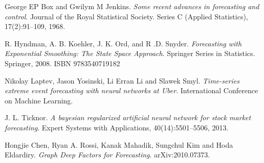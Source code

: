 \documentclass[en]{pracamgr}
\begin{document}
\begin{thebibliography}{99}
 George EP Box and Gwilym M Jenkins. \textit{Some recent advances in forecasting and control}. Journal of the
Royal Statistical Society. Series C (Applied Statistics), 17(2):91–109, 1968.

 R. Hyndman, A. B. Koehler, J. K. Ord, and R .D. Snyder. \textit{Forecasting with Exponential Smoothing: The State Space Approach}. Springer Series in Statistics. Springer, 2008. ISBN
9783540719182

 Nikolay Laptev, Jason Yosinski, Li Erran Li and Slawek Smyl. \textit{Time-series extreme event forecasting with neural networks at Uber}. International Conference on Machine Learning.

 J. L. Ticknor. \textit{A bayesian regularized artificial neural network for stock market forecasting}. Expert Systems with Applications, 40(14):5501–5506, 2013.

 Hongjie Chen, Ryan A. Rossi, Kanak Mahadik, Sungchul Kim and Hoda Eldardiry. \textit{Graph Deep Factors for Forecasting}. arXiv:2010.07373.

%
%
%
%
%
%
%
%
%
%

\end{thebibliography}
\end{document}
